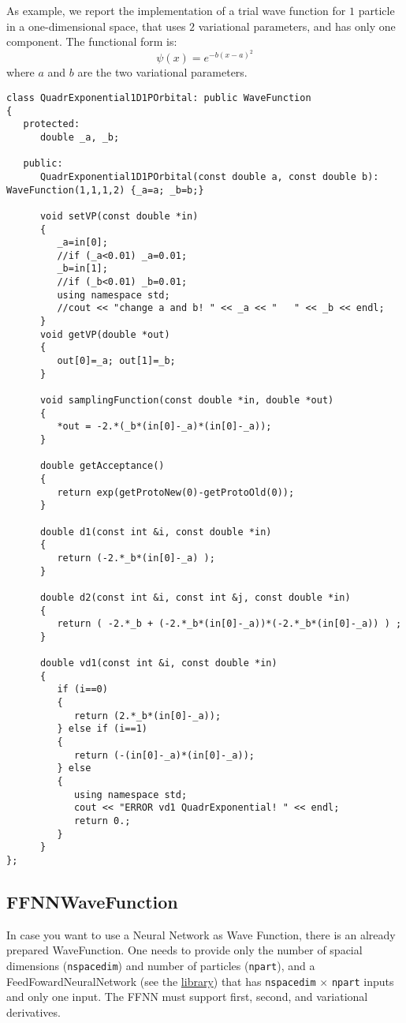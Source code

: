 \documentclass[11pt,a4paper,twoside]{article}
\begin{document}
As example, we report the implementation of a trial wave function for $1$ particle in a one-dimensional space, that uses $2$ variational parameters, and has only one component.
The functional form is:
\begin{equation}
   \psi(x) = e^{- b(x-a)^2}
\end{equation}
where $a$ and $b$ are the two variational parameters.

\begin{lstlisting}
class QuadrExponential1D1POrbital: public WaveFunction
{
   protected:
      double _a, _b;

   public:
      QuadrExponential1D1POrbital(const double a, const double b): WaveFunction(1,1,1,2) {_a=a; _b=b;}

      void setVP(const double *in)
      {
         _a=in[0];
         //if (_a<0.01) _a=0.01;
         _b=in[1];
         //if (_b<0.01) _b=0.01;
         using namespace std;
         //cout << "change a and b! " << _a << "   " << _b << endl;
      }
      void getVP(double *out)
      {
         out[0]=_a; out[1]=_b;
      }

      void samplingFunction(const double *in, double *out)
      {
         *out = -2.*(_b*(in[0]-_a)*(in[0]-_a));
      }

      double getAcceptance()
      {
         return exp(getProtoNew(0)-getProtoOld(0));
      }

      double d1(const int &i, const double *in)
      {
         return (-2.*_b*(in[0]-_a) );
      }

      double d2(const int &i, const int &j, const double *in)
      {
         return ( -2.*_b + (-2.*_b*(in[0]-_a))*(-2.*_b*(in[0]-_a)) ) ;
      }

      double vd1(const int &i, const double *in)
      {
         if (i==0)
         {
            return (2.*_b*(in[0]-_a));
         } else if (i==1)
         {
            return (-(in[0]-_a)*(in[0]-_a));
         } else
         {
            using namespace std;
            cout << "ERROR vd1 QuadrExponential! " << endl;
            return 0.;
         }
      }
};
\end{lstlisting}




\subsection{FFNNWaveFunction} %
\label{sub:ffnnwavefunction}

In case you want to use a Neural Network as Wave Function, there is an already prepared WaveFunction.
One needs to provide only the number of spacial dimensions (\verb+nspacedim+) and number of particles (\verb+npart+), and a FeedFowardNeuralNetwork (see the \href{https://github.com/francesco086/FeedForwardNeuralNetwork}{library}) that has \verb+nspacedim+ $\times$ \verb+npart+ inputs and only one input.
The FFNN must support first, second, and variational derivatives.
\end{document}
